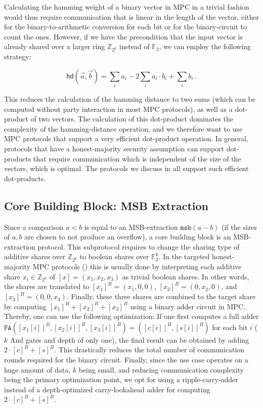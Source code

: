 \documentclass[a4paper,11pt,
]{article}
\newcommand{\F}{\ensuremath{\mathbb{F}}\xspace}
\newcommand{\Z}{\ensuremath{\mathbb{Z}}\xspace}
\newcommand{\shared}[1]{\ensuremath{[{#1}]}}
\newcommand{\sharedB}[1]{\ensuremath{[{#1}]^B}}
\begin{document}
Calculating the hamming weight of a binary vector in MPC in a trivial fashion would thus require communication that is linear in the length of the vector, either for the binary-to-arithmetic conversion for each bit or for the binary-circuit to count the ones. However, if we have the precondition that the input vector is already shared over a larger ring $\Z_{2^k}$ instead of $\F_2$, we can employ the following strategy:

\[
    \mathsf{hd}(\vec{a}, \vec{b}) = \sum_i a_i - 2\sum_i a_i \cdot b_i + \sum_i b_i\,.
\]

This reduces the calculation of the hamming distance to two sums (which can be computed without party interaction in most MPC protocols), as well as a dot-product of two vectors.
The calculation of this dot-product dominates the complexity of the hamming-distance operation, and we therefore want to use MPC protocols that support a very efficient dot-product operation.
In general, protocols that have a honest-majority security assumption can support dot-products that require communication which is independent of the size of the vectors, which is optimal.
The protocols we discuss in  all support such efficient dot-products.

\subsection{Core Building Block: MSB Extraction} \label{sec::a2b}

Since a comparison $a < b$ is equal to an MSB-extraction $\texttt{msb}(a-b)$ (if the sizes of $a,b$ are chosen to not produce an overflow), a core building block is an MSB-extraction protocol. This subprotocol requires to change the sharing type of additive shares over $\Z_{2^k}$ to boolean shares over $\F_2^k$. In the targeted honest-majority MPC protocols () this is usually done by interpreting each additive share $x_i \in \Z_{2^k}$ of $\shared{x}=(x_1, x_2, x_3)$ as trivial boolean shares. In other words, the shares are translated to $\sharedB{x_1} = (x_1, 0, 0)$, $\sharedB{x_2} = (0, x_2, 0)$, and $\sharedB{x_3} = (0, 0, x_3)$. Finally, these three shares are  combined to the target share by computing $\sharedB{x_1} + \sharedB{x_2} + \sharedB{x_3}$ using a binary adder circuit in MPC. Thereby, one can use the following optimization: If one first computes a full adder $\texttt{FA}(\sharedB{x_1[i]}, \sharedB{x_2[i]}, \sharedB{x_3[i]}) = (\sharedB{c[i]}, \sharedB{s[i]})$ for each bit $i$ ($k$ And gates and depth of only one), the final result can be obtained by adding $2 \cdot \sharedB{c} + \sharedB{s}$. This drastically reduces the total number of communication rounds required for the binary circuit.
Finally, since the use case operates on a huge amount of data, $k$ being small, and reducing communication complexity being the primary optimization point, we opt for using a ripple-carry-adder instead of a depth-optimized carry-lookahead adder for computing $2 \cdot \sharedB{c} + \sharedB{s}$.
\end{document}
